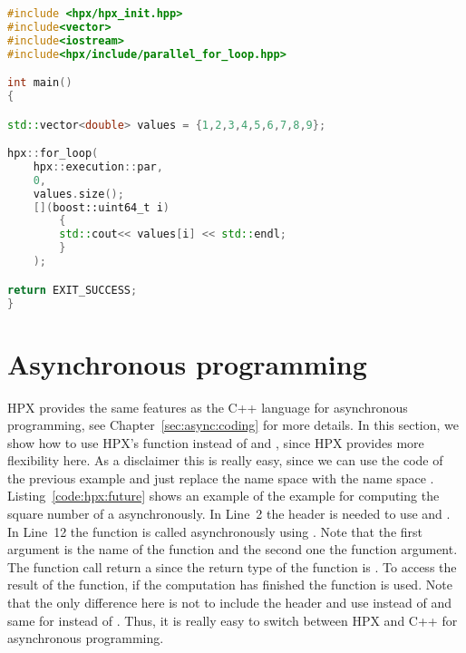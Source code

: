 \begin{lstlisting}[language=c++,caption={Parallel range-based for loops using HPX.\label{code:hpx:parallel:range:loop}},float,floatplacement=htb]
#include <hpx/hpx_init.hpp>
#include<vector>
#include<iostream>
#include<hpx/include/parallel_for_loop.hpp>

int main()
{

std::vector<double> values = {1,2,3,4,5,6,7,8,9};

hpx::for_loop(
	hpx::execution::par, 
	0, 
	values.size();
	[](boost::uint64_t i)
		{
		std::cout<< values[i] << std::endl;
		}
	);

return EXIT_SUCCESS;
}

\end{lstlisting}

\section{Asynchronous programming}
\label{sec:hpx:async}
HPX provides the same features as the C++ language for asynchronous programming, see Chapter~\ref{sec:async:coding} for more details. In this section, we show how to use HPX's function instead of  and , since HPX provides more flexibility here. As a disclaimer this is really easy, since we can use the code of the previous example and just replace the name space  with the name space . Listing~\ref{code:hpx:future} shows an example of the example for computing the square number of a asynchronously. In Line~2 the header  is needed to use  and . In Line~12 the function  is called asynchronously using . Note that the first argument is the name of the function and the second one the function argument. The function call return a  since the return type of the function is . To access the result of the function, if the computation has finished the function  is used. Note that the only difference here is not to include the header  and use  instead of  and same for  instead of . Thus, it is really easy to switch between HPX and C++ for asynchronous programming.

